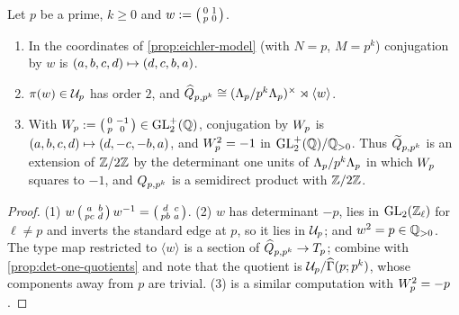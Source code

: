 \begin{proposition}\label{prop:prime-helling}
Let $p$ be a prime, $k \geq 0$ and $w := \left(\begin{smallmatrix} 0 & 1 \\ p & 0 \end{smallmatrix}\right)$.
\begin{enumerate}
\item In the coordinates of \cref{prop:eichler-model} (with $N = p$,
  $M = p^{k}$) conjugation by $w$ is
  $(a,b,c,d) \mapsto (d,c,b,a)$.
\item $\pi(w) \in \mathcal{U}_{p}$ has order $2$, and
  $\widehat{Q}_{p,p^{k}} \cong
  (\Lambda_{p}/p^{k}\Lambda_{p})^{\times} \rtimes \langle w\rangle$.
\item With $W_{p} := \left(\begin{smallmatrix} 0 & -1 \\ p & 0 \end{smallmatrix}\right) \in \mathrm{GL}_{2}^{+}(\mathbb{Q})$,
  conjugation by $W_{p}$ is $(a,b,c,d) \mapsto
  (d,-c,-b,a)$, and $W_{p}^{2} = -1$ in
  $\mathrm{GL}_{2}^{+}(\mathbb{Q})/\mathbb{Q}_{>0}$. Thus $\widetilde{Q}_{p,p^{k}}$ is an extension
  of $\mathbb{Z}/2\mathbb{Z}$ by the determinant one units of
  $\Lambda_{p}/p^{k}\Lambda_{p}$ in which $W_{p}$ squares to
  $-1$, and $Q_{p,p^{k}}$ is a semidirect product with
  $\mathbb{Z}/2\mathbb{Z}$.
\end{enumerate}
\end{proposition}

\begin{proof}
(1) $w\left(\begin{smallmatrix} a & b \\ pc & d \end{smallmatrix}\right)w^{-1} = \left(\begin{smallmatrix} d & c \\ pb & a \end{smallmatrix}\right)$. (2) $w$ has
determinant $-p$, lies in $\GL{2}{\pAdicIntegers{\ell}}$ for $\ell \neq p$
and inverts the standard edge at $p$, so it lies in $\mathcal{U}_{p}$; and
$w^{2} = p \in \mathbb{Q}_{>0}$. The type map restricted to
$\langle w\rangle$ is a section of $\widehat{Q}_{p,p^{k}} \to
T_{p}$; combine with \cref{prop:det-one-quotients} and note that the
quotient is $\MaxCompact{p}/\GammaPrincipal[ad]{p}{p^k}$, whose
components away from $p$ are trivial. (3) is a similar computation with
$W_{p}^{2} = -p$.
\end{proof}

